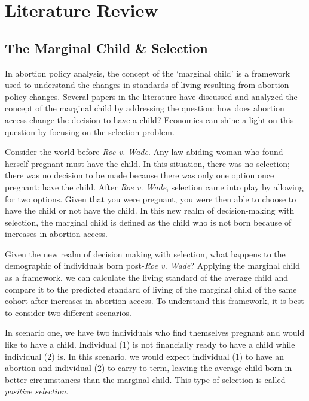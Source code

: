 \section{Literature Review}
    \subsection{The Marginal Child \& Selection}
        In abortion policy analysis, the concept of the `marginal child' is a framework used to understand the changes in standards of living resulting from abortion policy changes. Several papers in the literature have discussed and analyzed the concept of the marginal child by addressing the question: how does abortion access change the decision to have a child? Economics can shine a light on this question by focusing on the selection problem.

        Consider the world before \textit{Roe v. Wade}. Any law-abiding woman who found herself pregnant must have the child. In this situation, there was no selection; there was no decision to be made because there was only one option once pregnant: have the child. After \textit{Roe v. Wade}, selection came into play by allowing for two options. Given that you were pregnant, you were then able to choose to have the child or not have the child. In this new realm of decision-making with selection, the marginal child is defined as the child who is not born because of increases in abortion access.

        Given the new realm of decision making with selection, what happens to the demographic of individuals born post-\textit{Roe v. Wade}? Applying the marginal child as a framework, we can calculate the living standard of the average child and compare it to the predicted standard of living of the marginal child of the same cohort after increases in abortion access. To understand this framework, it is best to consider two different scenarios.

        In scenario one, we have two individuals who find themselves pregnant and would like to have a child. Individual (1) is not financially ready to have a child while individual (2) is. In this scenario, we would expect individual (1) to have an abortion and individual (2) to carry to term, leaving the average child born in better circumstances than the marginal child. This type of selection is called \textit{positive selection}.

